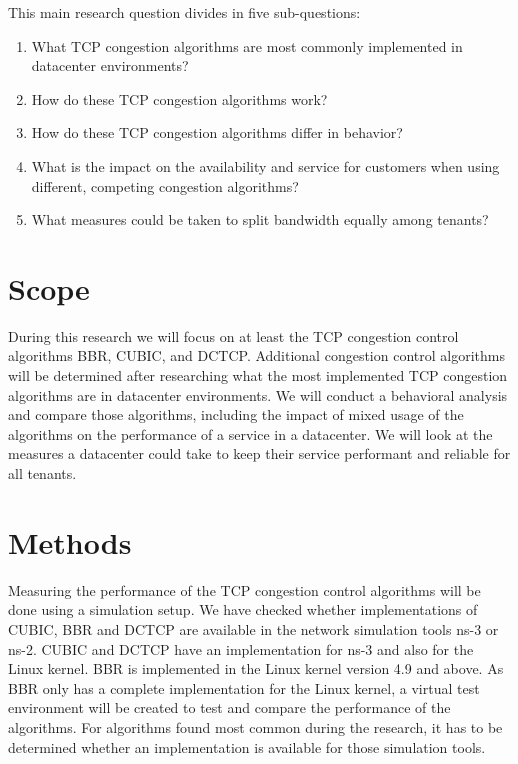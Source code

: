 \documentclass{article}
\begin{document}
\vspace{0.5cm}

This main research question divides in five sub-questions:

\begin{enumerate}
	\item What TCP congestion algorithms are most commonly implemented in datacenter environments?
	\item How do these TCP congestion algorithms work?
	\item How do these TCP congestion algorithms differ in behavior?
	\item What is the impact on the availability and service for customers when using different, competing congestion algorithms?
	\item What measures could be taken to split bandwidth equally among tenants?
\end{enumerate}


\section{Scope}

During this research we will focus on at least the TCP congestion control
algorithms BBR, CUBIC, and DCTCP. Additional congestion control algorithms will
be determined after researching what the most implemented TCP congestion
algorithms are in datacenter environments. We will conduct a behavioral
analysis and compare those algorithms, including the impact of mixed usage of
the algorithms on the performance of a service in a datacenter. We will look at
the measures a datacenter could take to keep their service performant and
reliable for all tenants.

\section{Methods}
Measuring the performance of the TCP congestion control algorithms will be done using a simulation setup. We have checked whether implementations of CUBIC, BBR and DCTCP are available in the network simulation tools ns-3 or ns-2. CUBIC and DCTCP have an implementation for ns-3 \cite{git-tcp-cubic} \cite{git-tcp-dctcp} and also for the Linux kernel. BBR is implemented in the Linux kernel version 4.9 and above. As BBR only has a complete implementation for the Linux kernel, a virtual test environment will be created to test and compare the performance of the algorithms. For algorithms found most common during the research,  it has to be determined whether an implementation is available for those simulation tools.
\end{document}

